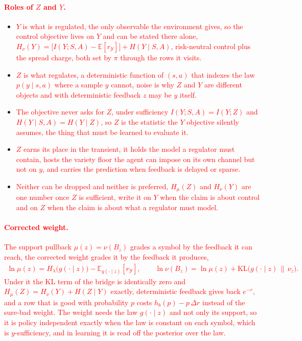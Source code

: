 \documentclass[10pt]{article}
\newcommand{\add}[1]{\textcolor{red}{#1}}
\begin{document}
\paragraph{\add{Roles of $Z$ and $Y$.}}
\begin{itemize}
  \item \add{$Y$ is what is regulated, the only observable the environment gives, so the control objective lives on $Y$ and can be stated there alone, $H_\nu(Y) = \big[I(Y;S,A) - \mathbb E[r_{\mathcal Y}]\big] + H(Y \mid S,A)$, risk-neutral control plus the spread charge, both set by $\pi$ through the rows it visits.}
  \item \add{$Z$ is what regulates, a deterministic function of $(s,a)$ that indexes the law $p(y \mid s,a)$ where a sample $y$ cannot, noise is why $Z$ and $Y$ are different objects and with deterministic feedback $z$ may be $y$ itself.}
  \item \add{The objective never asks for $Z$, under sufficiency $I(Y;S,A) = I(Y;Z)$ and $H(Y \mid S,A) = H(Y \mid Z)$, so $Z$ is the statistic the $Y$ objective silently assumes, the thing that must be learned to evaluate it.}
  \item \add{$Z$ earns its place in the transient, it holds the model a regulator must contain, hosts the variety floor the agent can impose on its own channel but not on $y$, and carries the prediction when feedback is delayed or sparse.}
  \item \add{Neither can be dropped and neither is preferred, $H_\mu(Z)$ and $H_\nu(Y)$ are one number once $Z$ is sufficient, write it on $Y$ when the claim is about control and on $Z$ when the claim is about what a regulator must model.}
\end{itemize}

\paragraph{\add{Corrected weight.}}
\add{The support pullback $\mu(z) = \nu(B_z)$ grades a symbol by the feedback it can reach, the corrected weight grades it by the feedback it produces,
\begin{align*}
  \ln \mu(z) = H_\lambda\big(g(\cdot \mid z)\big) - \mathbb E_{g(\cdot \mid z)}[r_{\mathcal Y}], \qquad
  \ln \nu(B_z) = \ln \mu(z) + \mathrm{KL}\big(g(\cdot \mid z)\,\|\,\nu_z\big).
\end{align*}
Under it the KL term of the bridge is identically zero and $H_\mu(Z) = H_\nu(Y) + H(Z \mid Y)$ exactly, deterministic feedback gives back $e^{-r}$, and a row that is good with probability $p$ costs $h_b(p) - p\,\Delta r$ instead of the sure-bad weight.
The weight needs the law $g(\cdot \mid z)$ and not only its support, so it is policy independent exactly when the law is constant on each symbol, which is $y$-sufficiency, and in learning it is read off the posterior over the law.}
\end{document}
